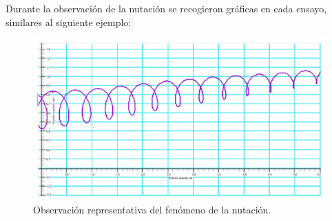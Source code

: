 \documentclass[a4paper]{article}
\begin{document}
Durante la observación de la nutación se recogieron gráficas en cada ensayo, similares al siguiente ejemplo:
\begin{figure}
\begin{center}
\includegraphics[height=8 cm]{nuta1.png}
\caption{Observación representativa del fenómeno de la nutación.}
\end{center}
\end{figure}
\end{document}
